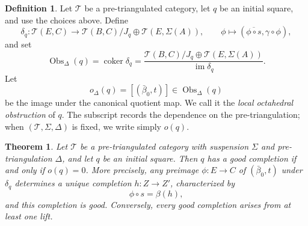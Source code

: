 \documentclass[a4paper,11pt,reqno]{amsart}
\newtheorem{theorem}{Theorem}[section]
\theoremstyle{definition}
\newtheorem{definition}[definition]{Definition}
\theoremstyle{plain}
\numberwithin{equation}{section}
\newcommand{\T}{\mathcal T}
\newcommand{\coker}{\operatorname{coker}}
\begin{document}
\begin{definition}
\label{def:octahedral-defect}
Let $\T$ be a pre-triangulated category, let $q$ be an
initial square, and use the choices above.  Define
\begin{equation}
\label{eq:boundary-map}
 \delta_q:\T(E,C)\longrightarrow
 \T(B,C)/J_q\oplus\T(E,\Sigma(A)),
 \qquad
 \phi\longmapsto(\overline{\phi\circ s},\gamma\circ\phi),
\end{equation}
and set
\begin{equation}
\label{eq:octahedral-defect}
 \operatorname{Obs}_\Delta(q)=\coker\delta_q
 =\frac{\T(B,C)/J_q\oplus\T(E,\Sigma(A))}{\operatorname{im}\delta_q}.
\end{equation}
Let
\[
 o_\Delta(q)=[(\bar\beta_0,t)]\in\operatorname{Obs}_\Delta(q)
\]
be the image under the canonical quotient map.  We call it the
\emph{local octahedral obstruction} of $q$.  The subscript records the
dependence on the pre-triangulation; when $(\T,\Sigma,\Delta)$ is fixed, we
write simply $o(q)$.
\end{definition}


\begin{theorem}
\label{thm:boundary-lifting}
Let \(\T\) be a pre-triangulated category with suspension \(\Sigma\) and
pre-triangulation \(\Delta\), and let \(q\) be an initial square.  Then \(q\)
has a good completion if and only if \(o(q)=0\).
More precisely, any preimage $\phi:E\to C$ of
$(\bar\beta_0,t)$ under $\delta_q$ determines a unique completion $h:Z\to Z'$,
characterized by
\begin{equation}
\label{eq:recover-completion}
 \phi\circ s=\beta(h),
\end{equation}
and this completion is good.  Conversely, every good completion arises from at
least one lift.
\end{theorem}
\end{document}
